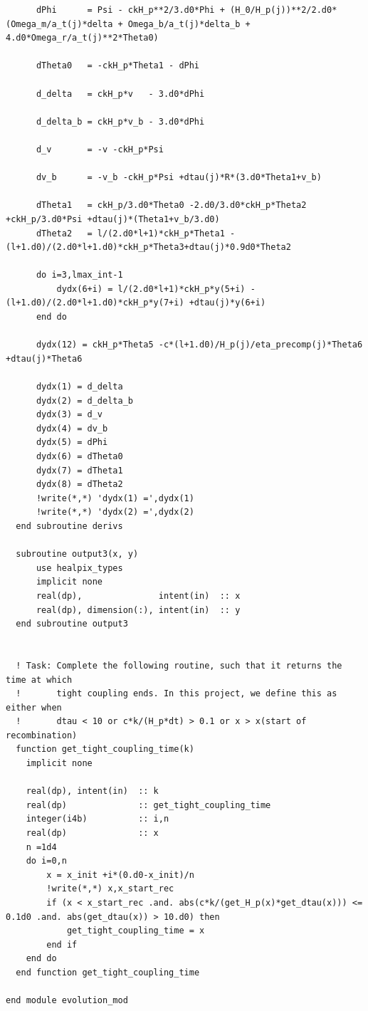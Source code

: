 \documentclass[a4paper]{report}
\begin{document}
\begin{verbatim}
      dPhi      = Psi - ckH_p**2/3.d0*Phi + (H_0/H_p(j))**2/2.d0*(Omega_m/a_t(j)*delta + Omega_b/a_t(j)*delta_b + 4.d0*Omega_r/a_t(j)**2*Theta0)

      dTheta0   = -ckH_p*Theta1 - dPhi

      d_delta   = ckH_p*v   - 3.d0*dPhi

      d_delta_b = ckH_p*v_b - 3.d0*dPhi

      d_v       = -v -ckH_p*Psi

      dv_b      = -v_b -ckH_p*Psi +dtau(j)*R*(3.d0*Theta1+v_b)

      dTheta1   = ckH_p/3.d0*Theta0 -2.d0/3.d0*ckH_p*Theta2 +ckH_p/3.d0*Psi +dtau(j)*(Theta1+v_b/3.d0)
      dTheta2   = l/(2.d0*l+1)*ckH_p*Theta1 - (l+1.d0)/(2.d0*l+1.d0)*ckH_p*Theta3+dtau(j)*0.9d0*Theta2

      do i=3,lmax_int-1
          dydx(6+i) = l/(2.d0*l+1)*ckH_p*y(5+i) - (l+1.d0)/(2.d0*l+1.d0)*ckH_p*y(7+i) +dtau(j)*y(6+i)
      end do

      dydx(12) = ckH_p*Theta5 -c*(l+1.d0)/H_p(j)/eta_precomp(j)*Theta6 +dtau(j)*Theta6

      dydx(1) = d_delta
      dydx(2) = d_delta_b
      dydx(3) = d_v
      dydx(4) = dv_b
      dydx(5) = dPhi
      dydx(6) = dTheta0
      dydx(7) = dTheta1
      dydx(8) = dTheta2
      !write(*,*) 'dydx(1) =',dydx(1)
      !write(*,*) 'dydx(2) =',dydx(2)
  end subroutine derivs

  subroutine output3(x, y)
      use healpix_types
      implicit none
      real(dp),               intent(in)  :: x
      real(dp), dimension(:), intent(in)  :: y
  end subroutine output3


  ! Task: Complete the following routine, such that it returns the time at which
  !       tight coupling ends. In this project, we define this as either when
  !       dtau < 10 or c*k/(H_p*dt) > 0.1 or x > x(start of recombination)
  function get_tight_coupling_time(k)
    implicit none

    real(dp), intent(in)  :: k
    real(dp)              :: get_tight_coupling_time
    integer(i4b)          :: i,n
    real(dp)              :: x
    n =1d4
    do i=0,n
        x = x_init +i*(0.d0-x_init)/n
        !write(*,*) x,x_start_rec
        if (x < x_start_rec .and. abs(c*k/(get_H_p(x)*get_dtau(x))) <= 0.1d0 .and. abs(get_dtau(x)) > 10.d0) then 
            get_tight_coupling_time = x
        end if
    end do
  end function get_tight_coupling_time

end module evolution_mod 
\end{verbatim}



\end{document}
